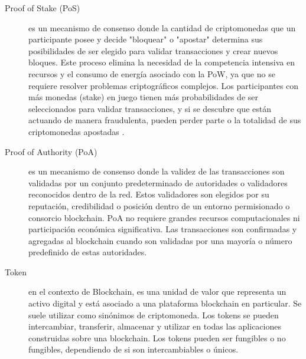 \documentclass[main.tex]{subfiles}
\begin{document}
\begin{description}
	\item[Proof of Stake (PoS)] es un mecanismo de consenso donde la cantidad de criptomonedas que un participante posee y decide "bloquear" o "apostar" determina sus posibilidades de ser elegido para validar transacciones y crear nuevos bloques. Este proceso elimina la necesidad de la competencia intensiva en recursos y el consumo de energía asociado con la PoW, ya que no se requiere resolver problemas criptográficos complejos. Los participantes con más monedas (stake) en juego tienen más probabilidades de ser seleccionados para validar transacciones, y si se descubre que están actuando de manera fraudulenta, pueden perder parte o la totalidad de sus criptomonedas apostadas \cite{rennock2018blockchain}.

	\item[Proof of Authority (PoA)] es un mecanismo de consenso donde la validez de las transacciones son validadas por un conjunto predeterminado de autoridades o validadores reconocidos dentro de la red. Estos validadores son elegidos por su reputación, credibilidad o posición dentro de un entorno permisionado o consorcio blockchain. PoA no requiere grandes recursos computacionales ni participación económica significativa. Las transacciones son confirmadas y agregadas al blockchain cuando son validadas por una mayoría o número predefinido de estas autoridades.
	
	\item[Token] en el contexto de Blockchain, es una unidad de valor que representa un activo digital y está asociado a una plataforma blockchain en particular. Se suele utilizar como sinónimos de criptomoneda. Los tokens se pueden intercambiar, transferir, almacenar y utilizar en todas las aplicaciones construidas sobre una blockchain. Los tokens pueden ser fungibles o no fungibles, dependiendo de si son intercambiables o únicos.

\end{description}
\end{document}
